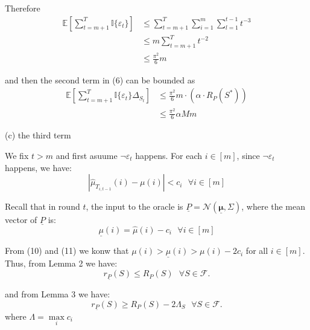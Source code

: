 \documentclass[opre,sglanonrev]{informs4}
\begin{document}
Therefore
\begin{equation}
	\begin{aligned}
		\mathbb{E}[\sum_{t=m+1}^{T}\mathbb{I}\{\varepsilon_t\}]
		&\leq \sum_{t=m+1}^{T} \sum_{i=1}^{m} \sum_{l=1}^{t-1}t^{-3} \\
		&\leq m \sum_{t=m+1}^{T}t^{-2} \\
		&\leq \frac{\pi^2}{6}m
	\end{aligned}
\end{equation}

and then the second term in (6) can be bounded as
\begin{equation}
	\begin{aligned}
		\mathbb{E}[\sum_{t=m+1}^{T}\mathbb{I}\{\varepsilon_t\}\Delta_{S_t}]&\leq \frac{\pi^2}{6}m \cdot (\alpha \cdot R_P(S^*))\\
        &\leq \frac{\pi^2}{6}\alpha M m
	\end{aligned}
\end{equation}

(c) the third term 

We fix $t>m$ and first asuume $\lnot \varepsilon_t$ happens. For each $i \in [m]$, since $\lnot \varepsilon_t$ happens, we have:
\begin{equation}
	|\hat{\mu}_{T_{i,t-1}}(i)-\mu(i)| < c_i ~~~ \forall i \in [m]
\end{equation}

Recall that in round $t$, the input to the oracle is $\underline{P} = \mathcal{N}(\underline{\boldsymbol{\mu}},\Sigma)$, where the mean vector of $\underline{P}$ is:
\begin{equation}
	\underline{\mu}(i) = \hat{\mu}(i)-c_i ~~~ \forall i \in [m]
\end{equation}

From (10) and (11) we  konw that $\mu(i)>\underline{\mu}(i)>\mu(i)-2c_i$ for all $i \in [m]$. Thus, from Lemma 2 we have:
\begin{equation}
	r_{\underline{P}}(S)\leq R_P(S) ~~~ \forall S \in \mathcal{F}.
\end{equation}

and from Lemma 3 we have:
\begin{equation}
	r_{\underline{P}}(S)\geq R_P(S)-2\Lambda_S ~~~ \forall S \in \mathcal{F}.
\end{equation}
where $\Lambda = \mathop{\max}\limits_{i}c_i$
\end{document}
